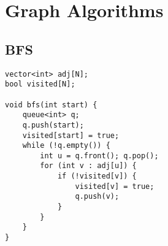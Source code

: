 
\section{Graph Algorithms}

\subsection{BFS}
\begin{lstlisting}
vector<int> adj[N];
bool visited[N];

void bfs(int start) {
    queue<int> q;
    q.push(start);
    visited[start] = true;
    while (!q.empty()) {
        int u = q.front(); q.pop();
        for (int v : adj[u]) {
            if (!visited[v]) {
                visited[v] = true;
                q.push(v);
            }
        }
    }
}
\end{lstlisting}
